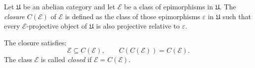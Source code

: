 Let $\mathfrak{U}$ be an abelian category and let $\mathcal{E}$ be a class of epimorphisms in $\mathfrak{U}$. The {\it closure} $C(\mathcal{E})$ of $\mathcal{E}$ is defined as the class of those epimorphisms $\varepsilon$ in $\mathfrak{U}$ such that every $\mathcal{E}$-projective object of $\mathfrak{U}$ is also projective relative to $\varepsilon$.

The closure satisfies:
\[
\mathcal{E} \subseteq C(\mathcal{E}), \qquad C(C(\mathcal{E})) = C(\mathcal{E}).
\]
The class $\mathcal{E}$ is called {\it closed} if $\mathcal{E} = C(\mathcal{E})$.
